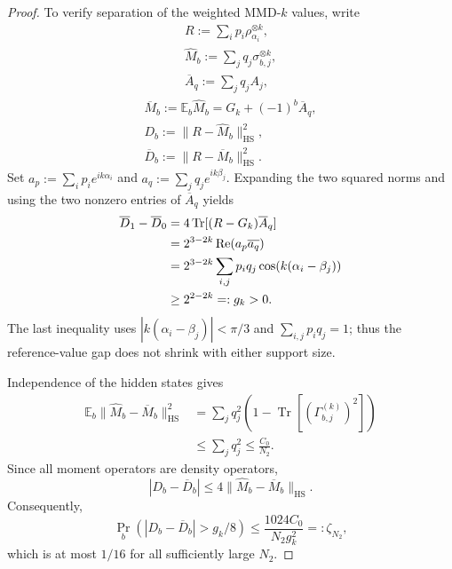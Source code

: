 \documentclass[aps,prx,reprint,superscriptaddress,amsmath,amssymb,longbibliography,floatfix]{revtex4-2}
\theoremstyle{plain}
\theoremstyle{definition}
\theoremstyle{remark}
\begin{document}
\begin{proof}
To verify separation of the weighted MMD-\(k\) values, write
\[
\begin{gathered}
R:=\sum_i p_i\rho_{\alpha_i}^{\otimes k},
    \\
    \widehat M_b:=\sum_jq_j\sigma_{b,j}^{\otimes k},
    \\
    \overline A_q:=\sum_jq_jA_j,
\end{gathered}
\]
\[
\begin{gathered}
\overline M_b:=\mathbb E_b\widehat M_b=G_k+(-1)^b\overline A_q,
    \\
    D_b:=\|R-\widehat M_b\|_{\mathrm{HS}}^2,
    \\
    \overline D_b:=\|R-\overline M_b\|_{\mathrm{HS}}^2.
\end{gathered}
\]
Set \(a_p:=\sum_i p_i e^{ik\alpha_i}\) and \(a_q:=\sum_jq_j e^{ik\beta_j}\). Expanding the two squared norms and using the two nonzero entries of \(\overline A_q\) yields
\begin{align}
\overline D_1-\overline D_0
    &=4\operatorname{Tr}[(R-G_k)\overline A_q]\notag\\
    &=2^{3-2k}\operatorname{Re}(a_p\overline{a_q})\notag\\
    &=2^{3-2k}\sum_{i,j}p_iq_j\cos(k(\alpha_i-\beta_j))\notag\\
    &\ge 2^{2-2k}=:g_k>0.
\label{eq:app-nonuniform-mmd-reference-gap}
\end{align}
The last inequality uses \(|k(\alpha_i-\beta_j)|<\pi/3\) and \(\sum_{i,j}p_iq_j=1\); thus the reference-value gap does not shrink with either support size.

Independence of the hidden states gives
\[
\begin{aligned}
\mathbb E_b\|\widehat M_b-\overline M_b\|_{\mathrm{HS}}^2
    &=\sum_jq_j^2\left(1-\operatorname{Tr}[(\Gamma_{b,j}^{(k)})^2]\right)\\
    &\le\sum_jq_j^2\le\frac{C_0}{N_2}.
\end{aligned}
\]
Since all moment operators are density operators,
\[
    |D_b-\overline D_b|
    \le 4\|\widehat M_b-\overline M_b\|_{\mathrm{HS}}.
\]
Consequently,
\begin{equation}
    \Pr_b(|D_b-\overline D_b|>g_k/8)
    \le \frac{1024C_0}{N_2g_k^2}=:\zeta_{N_2},
\label{eq:app-nonuniform-mmd-gap-concentration}
\end{equation}
which is at most \(1/16\) for all sufficiently large \(N_2\).


\end{proof}
\end{document}

